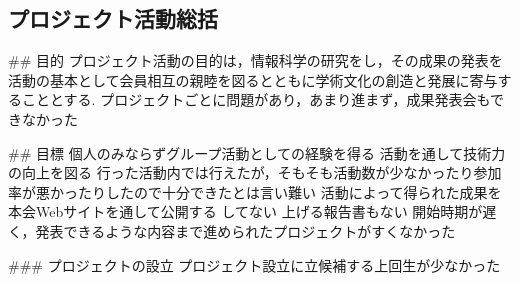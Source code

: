 \subsection*{プロジェクト活動総括}


## 目的
プロジェクト活動の目的は，情報科学の研究をし，その成果の発表を活動の基本として会員相互の親睦を図るとともに学術文化の創造と発展に寄与することとする.
    プロジェクトごとに問題があり，あまり進まず，成果発表会もできなかった

## 目標
個人のみならずグループ活動としての経験を得る
活動を通して技術力の向上を図る
    行った活動内では行えたが，そもそも活動数が少なかったり参加率が悪かったりしたので十分できたとは言い難い
活動によって得られた成果を本会Webサイトを通して公開する
    してない
    上げる報告書もない
    開始時期が遅く，発表できるような内容まで進められたプロジェクトがすくなかった

### プロジェクトの設立
    プロジェクト設立に立候補する上回生が少なかった
